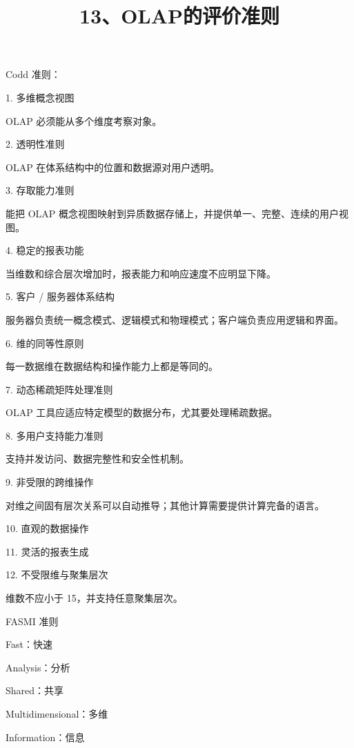 \documentclass[UTF8,zihao=-4]{ctexart}
\begin{document}
\title{13、OLAP的评价准则}
\author{}
\date{}
\maketitle

Codd 准则：\par
1. 多维概念视图\par
OLAP 必须能从多个维度考察对象。\par
2. 透明性准则\par
OLAP 在体系结构中的位置和数据源对用户透明。\par
3. 存取能力准则\par
能把 OLAP 概念视图映射到异质数据存储上，并提供单一、完整、连续的用户视图。\par
4. 稳定的报表功能\par
当维数和综合层次增加时，报表能力和响应速度不应明显下降。\par
5. 客户 / 服务器体系结构\par
服务器负责统一概念模式、逻辑模式和物理模式；客户端负责应用逻辑和界面。\par
6. 维的同等性原则\par
每一数据维在数据结构和操作能力上都是等同的。\par
7. 动态稀疏矩阵处理准则\par
OLAP 工具应适应特定模型的数据分布，尤其要处理稀疏数据。\par
8. 多用户支持能力准则\par
支持并发访问、数据完整性和安全性机制。\par
9. 非受限的跨维操作\par
对维之间固有层次关系可以自动推导；其他计算需要提供计算完备的语言。\par
10. 直观的数据操作\par
11. 灵活的报表生成\par
12. 不受限维与聚集层次\par
维数不应小于 15，并支持任意聚集层次。\par

FASMI 准则\par

Fast：快速\par
Analysis：分析\par
Shared：共享\par
Multidimensional：多维\par
Information：信息\par
\end{document}
